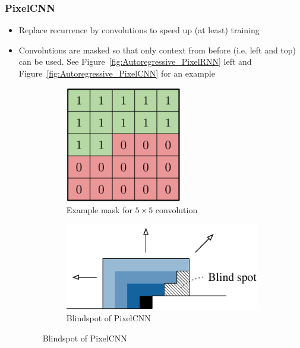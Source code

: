\subsubsection{PixelCNN}
\begin{itemize}
	\item Replace recurrence by convolutions to speed up (at least) training
	\item Convolutions are masked so that only context from before (i.e. left and top) can be used. See Figure~\ref{fig:Autoregressive_PixelRNN} left and Figure~\ref{fig:Autoregressive_PixelCNN} for an example
	\begin{figure}[ht!]
		\centering
		\begin{subfigure}{0.3\textwidth}
			\centering
			\includegraphics[width=0.6\textwidth]{figures/Autoregressive_Masked_Conv.png}
			\caption{Example mask for $5\times 5$ convolution}
		\end{subfigure}
		\hspace{2mm}
		\begin{subfigure}{0.32\textwidth}
			\centering
			\includegraphics[width=\textwidth]{figures/Autoregressive_PixelCNN_blindspot_problem.png}
			\caption{Blindspot of PixelCNN}
		\end{subfigure}

\end{figure}
\end{itemize}
